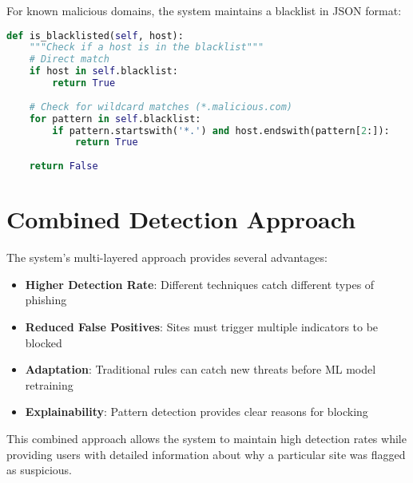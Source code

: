 For known malicious domains, the system maintains a blacklist in JSON format:

\begin{lstlisting}[language=Python, caption=Blacklist Checking]
def is_blacklisted(self, host):
    """Check if a host is in the blacklist"""
    # Direct match
    if host in self.blacklist:
        return True
        
    # Check for wildcard matches (*.malicious.com)
    for pattern in self.blacklist:
        if pattern.startswith('*.') and host.endswith(pattern[2:]):
            return True
    
    return False
\end{lstlisting}

\section{Combined Detection Approach}

The system's multi-layered approach provides several advantages:

\begin{itemize}
    \item \textbf{Higher Detection Rate}: Different techniques catch different types of phishing
    \item \textbf{Reduced False Positives}: Sites must trigger multiple indicators to be blocked
    \item \textbf{Adaptation}: Traditional rules can catch new threats before ML model retraining
    \item \textbf{Explainability}: Pattern detection provides clear reasons for blocking
\end{itemize}

This combined approach allows the system to maintain high detection rates while providing users with detailed information about why a particular site was flagged as suspicious.
